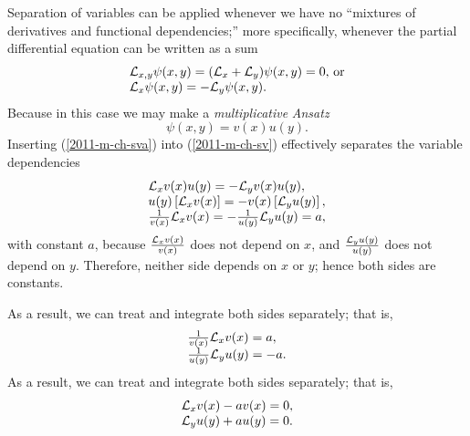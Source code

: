 Separation of variables can be applied whenever we have no ``mixtures of derivatives and functional dependencies;''
more specifically,
whenever the  partial differential equation can be written as a sum
\begin{equation}
\begin{array}  {l}
{\cal L}_{x,y} \psi(x,y) = ({\cal L}_{x} + {\cal L}_y)\psi (x,y) =  0\textrm{, or}  \\
{\cal L}_{x} \psi (x,y) =  - {\cal L}_y \psi (x,y).
\end{array}
\label{2011-m-ch-sveq}
\end{equation}
Because in this case we may make a {\em multiplicative} {\it Ansatz}
\begin{equation}
\psi (x,y)= v(x)u(y) .
\label{2011-m-ch-sva}
\end{equation}
Inserting (\ref{2011-m-ch-sva}) into (\ref{2011-m-ch-sv}) effectively  separates the variable dependencies
\begin{equation}
\begin{array}  {l}
{\cal L}_{x} v(x)u(y) =   - {\cal L}_y v(x)u(y), \\
u(y)\left[ {\cal L}_{x} v(x)\right]
 =   -  v(x)\left[{\cal L}_y u(y)\right]
, \\
\frac{1}{v(x)}{\cal L}_{x} v(x) =   - \frac{1}{u(y)}{\cal L}_y u(y)=a,
\end{array}
\label{2011-m-ch-sv1}
\end{equation}
with constant $a$, because
$\frac{{\cal L}_{x} v(x)}{v(x)}$  does not depend on $x$,
and  $\frac{{\cal L}_y u(y)}{u(y)}$  does not depend on $y$.
Therefore,
neither side depends on $x$ or $y$; hence both sides are constants.

As a result, we can treat and integrate both sides separately; that is,
\begin{equation}
\begin{array}  {l}
\frac{1}{v(x)} {\cal L}_{x} v(x)= a,\\
\frac{1}{u(y)}{\cal L}_y u(y)=-a
.
\end{array}
\label{2011-m-ch-sv2}
\end{equation}
As a result, we can treat and integrate both sides separately; that is,
\begin{equation}
\begin{array}  {l}
{\cal L}_{x} v(x)- av(x)=0,\\
{\cal L}_y u(y)+a u(y) = 0
.
\end{array}
\label{2011-m-ch-sv2or}
\end{equation}

